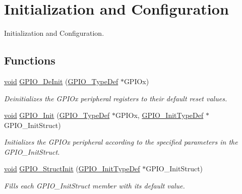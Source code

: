 \hypertarget{group___g_p_i_o___group1}{\section{Initialization and Configuration}
\label{group___g_p_i_o___group1}
}


Initialization and Configuration.  


\subsection*{Functions}
\begin{DoxyCompactItemize}
\item 
\hyperlink{group___n_a_m_e_ga18028b8badbf1ea7e704ccac3c488e82}{void} \hyperlink{group___g_p_i_o___group1_gaa60bdf3182c44b5fa818f237042f52ee}{G\-P\-I\-O\-\_\-\-De\-Init} (\hyperlink{struct_g_p_i_o___type_def}{G\-P\-I\-O\-\_\-\-Type\-Def} $\ast$G\-P\-I\-Ox)
\begin{DoxyCompactList}\small\item\em Deinitializes the G\-P\-I\-Ox peripheral registers to their default reset values. \end{DoxyCompactList}\item 
\hyperlink{group___n_a_m_e_ga18028b8badbf1ea7e704ccac3c488e82}{void} \hyperlink{group___g_p_i_o___group1_ga71abf9404261370d03cca449b88d3a65}{G\-P\-I\-O\-\_\-\-Init} (\hyperlink{struct_g_p_i_o___type_def}{G\-P\-I\-O\-\_\-\-Type\-Def} $\ast$G\-P\-I\-Ox, \hyperlink{struct_g_p_i_o___init_type_def}{G\-P\-I\-O\-\_\-\-Init\-Type\-Def} $\ast$G\-P\-I\-O\-\_\-\-Init\-Struct)
\begin{DoxyCompactList}\small\item\em Initializes the G\-P\-I\-Ox peripheral according to the specified parameters in the G\-P\-I\-O\-\_\-\-Init\-Struct. \end{DoxyCompactList}\item 
\hyperlink{group___n_a_m_e_ga18028b8badbf1ea7e704ccac3c488e82}{void} \hyperlink{group___g_p_i_o___group1_gab28de41278e7f8c63d0851e2733b10df}{G\-P\-I\-O\-\_\-\-Struct\-Init} (\hyperlink{struct_g_p_i_o___init_type_def}{G\-P\-I\-O\-\_\-\-Init\-Type\-Def} $\ast$G\-P\-I\-O\-\_\-\-Init\-Struct)
\begin{DoxyCompactList}\small\item\em Fills each G\-P\-I\-O\-\_\-\-Init\-Struct member with its default value. \end{DoxyCompactList}\item 

\end{DoxyCompactItemize}
